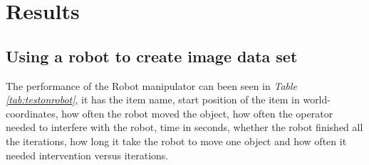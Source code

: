 \chapter{Results}

\section{Using a robot to create image data set}\label{resrobotcontrol}
The performance of the Robot manipulator can been seen in \textit{Table \ref{tab:testonrobot}}, it has the item name, start position of the item in world-coordinates, how often the robot moved the object, how often the operator needed to interfere with the robot, time in seconds, whether the robot finished all the iterations, how long it take the robot to move one object and how often it needed intervention versus iterations. 
\vspace{1cm}
